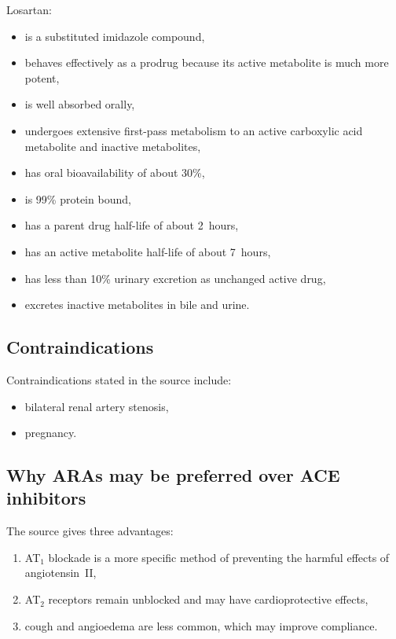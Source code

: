 \documentclass[11pt,a4paper]{article}
\begin{document}
Losartan:
\begin{itemize}
    \item is a substituted imidazole compound,
    \item behaves effectively as a prodrug because its active metabolite is much more potent,
    \item is well absorbed orally,
    \item undergoes extensive first-pass metabolism to an active carboxylic acid metabolite and inactive metabolites,
    \item has oral bioavailability of about 30\%,
    \item is 99\% protein bound,
    \item has a parent drug half-life of about 2~hours,
    \item has an active metabolite half-life of about 7~hours,
    \item has less than 10\% urinary excretion as unchanged active drug,
    \item excretes inactive metabolites in bile and urine.
\end{itemize}

\subsection{Contraindications}

Contraindications stated in the source include:
\begin{itemize}
    \item bilateral renal artery stenosis,
    \item pregnancy.
\end{itemize}

\subsection{Why ARAs may be preferred over ACE inhibitors}

The source gives three advantages:
\begin{enumerate}
    \item AT$_1$ blockade is a more specific method of preventing the harmful effects of angiotensin~II,
    \item AT$_2$ receptors remain unblocked and may have cardioprotective effects,
    \item cough and angioedema are less common, which may improve compliance.
\end{enumerate}
\end{document}
